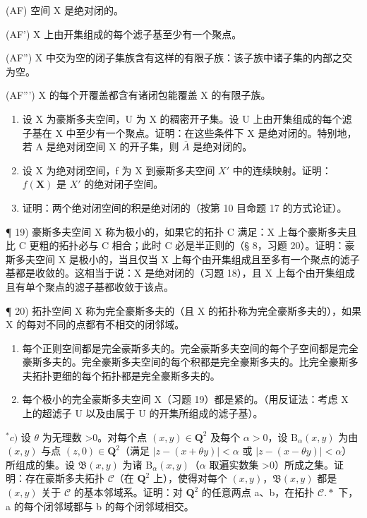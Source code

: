 (AF) 空间 X 是绝对闭的。

(AF') X 上由开集组成的每个滤子基至少有一个聚点。

(AF'') X 中交为空的闭子集族含有这样的有限子族：该子族中诸子集的内部之交为空。

(AF''') X 的每个开覆盖都含有诸闭包能覆盖 X 的有限子族。

\begin{enumerate}
\def\labelenumi{\alph{enumi})}
\setcounter{enumi}{1}
\item
  设 X 为豪斯多夫空间，U 为 X 的稠密开子集。设 U 上由开集组成的每个滤子基在 X 中至少有一个聚点。证明：在这些条件下 X 是绝对闭的。特别地，若 A 是绝对闭空间 X 的开子集，则 \(\overline{A}\) 是绝对闭的。
\item
  设 X 为绝对闭空间，f 为 X 到豪斯多夫空间 \(X'\) 中的连续映射。证明：\(f(\mathbf{X})\) 是 \(X'\) 的绝对闭子空间。
\item
  证明：两个绝对闭空间的积是绝对闭的（按第 10 目命题 17 的方式论证）。
\end{enumerate}

¶ 19) 豪斯多夫空间 X 称为极小的，如果它的拓扑 C 满足：X 上每个豪斯多夫且比 C 更粗的拓扑必与 C 相合；此时 C 必是半正则的（§ 8，习题 20）。证明：豪斯多夫空间 X 是极小的，当且仅当 X 上每个由开集组成且至多有一个聚点的滤子基都是收敛的。这相当于说：X 是绝对闭的（习题 18），且 X 上每个由开集组成且有单个聚点的滤子基都收敛于该点。

¶ 20) 拓扑空间 X 称为完全豪斯多夫的（且 X 的拓扑称为完全豪斯多夫的），如果 X 的每对不同的点都有不相交的闭邻域。

\begin{enumerate}
\def\labelenumi{\alph{enumi})}
\item
  每个正则空间都是完全豪斯多夫的。完全豪斯多夫空间的每个子空间都是完全豪斯多夫的。完全豪斯多夫空间的每个积都是完全豪斯多夫的。比完全豪斯多夫拓扑更细的每个拓扑都是完全豪斯多夫的。
\item
  每个极小的完全豪斯多夫空间 X（习题 19）都是紧的。（用反证法：考虑 X 上的超滤子 U 以及由属于 U 的开集所组成的滤子基）。
\end{enumerate}

\(^{*}c)\) 设 \(\theta\) 为无理数 \textgreater0。对每个点 \((x,y)\in\mathbf{Q}^{2}\) 及每个 \(\alpha>0\)，设 \(\mathrm{B}_{\alpha}(x,y)\) 为由 \((x,y)\) 与点 \((z,0)\in\mathbf{Q}^{2}\)（满足 \(|z-(x+\theta y)|<\alpha\) 或 \(|z-(x-\theta y)|<\alpha\)）所组成的集。设 \(\mathfrak{B}(x,y)\) 为诸 \(\mathrm{B}_{\alpha}(x,y)\)（\(\alpha\) 取遍实数集 \textgreater0）所成之集。证明：存在豪斯多夫拓扑 \(\mathcal{C}\)（在 \(\mathbf{Q}^{2}\) 上），使得对每个 \((x,y)\)，\(\mathfrak{B}(x,y)\) 都是 \((x,y)\) 关于 \(\mathcal{C}\) 的基本邻域系。证明：对 \(\mathbf{Q}^{2}\) 的任意两点 a、b，在拓扑 \(\mathcal{C}.*\) 下，a 的每个闭邻域都与 b 的每个闭邻域相交。

